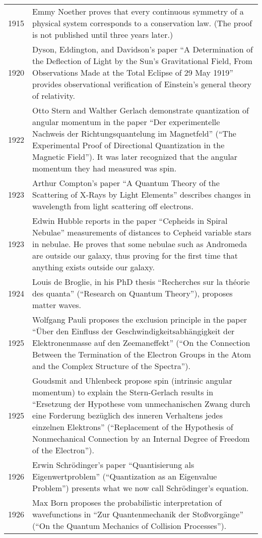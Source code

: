 \documentclass[../main.tex]{subfiles}
\begin{document}
\begin{center}
\begin{longtable}{p{}  p{}}
1915&Emmy Noether proves that every continuous symmetry of a physical system corresponds to a conservation law. (The proof is not published until three years later.)\\
1920&Dyson, Eddington, and Davidson's paper “A Determination of the Deflection of Light by the Sun's Gravitational Field, From Observations Made at the Total Eclipse of 29 May 1919” provides observational verification of Einstein's general theory of relativity.\\
1922&Otto Stern and Walther Gerlach demonstrate quantization of angular momentum in the paper “Der experimentelle Nachweis der Richtungsquantelung im Magnetfeld” (“The Experimental Proof of Directional Quantization in the Magnetic Field”). It was later recognized that the angular momentum they had measured was spin.\\
1923&Arthur Compton's paper “A Quantum Theory of the Scattering of X-Rays by Light Elements” describes changes in wavelength from light scattering off electrons.\\
1923&Edwin Hubble reports in the paper “Cepheids in Spiral Nebulae” measurements of distances to Cepheid variable stars in nebulae. He proves that some nebulae such as Andromeda are outside our galaxy, thus proving for the first time that anything exists outside our galaxy.\\
1924&Louis de Broglie, in his PhD thesis “Recherches sur la théorie des quanta” (“Research on Quantum Theory”), proposes matter waves.\\
1925&Wolfgang Pauli proposes the exclusion principle in the paper “Über den Einfluss der Geschwindigkeitsabhängigkeit der Elektronenmasse auf den Zeemaneffekt” (“On the Connection Between the Termination of the Electron Groups in the Atom and the Complex Structure of the Spectra”).\\
1925&Goudsmit and Uhlenbeck propose spin (intrinsic angular momentum) to explain the Stern-Gerlach results in “Ersetzung der Hypothese vom unmechanischen Zwang durch eine Forderung bezüglich des inneren Verhaltens jedes einzelnen Elektrons” (“Replacement of the Hypothesis of Nonmechanical Connection by an Internal Degree of Freedom of the Electron”).\\
1926&Erwin Schrödinger's paper “Quantisierung als Eigenwertproblem” (“Quantization as an Eigenvalue Problem”) presents what we now call Schrödinger's equation.\\
1926&Max Born proposes the probabilistic interpretation of wavefunctions in “Zur Quantenmechanik der Stoßvorgänge” (“On the Quantum Mechanics of Collision Processes”).\\

\end{longtable}
\end{center}
\end{document}
